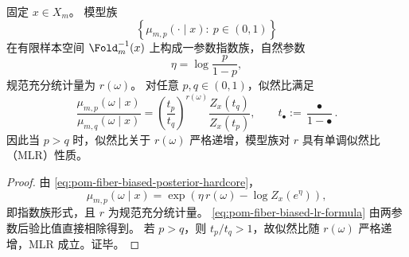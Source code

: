 \begin{proposition}\label{prop:pom-fiber-biased-posterior-mlr}
固定 \(x\in X_m\)。
模型族
\[
\left\{\mu_{m,p}(\cdot\mid x):\ p\in(0,1)\right\}
\]
在有限样本空间 \(\Fold_m^{-1}(x)\) 上构成一参数指数族，自然参数
\[
\eta=\log\frac{p}{1-p},
\]
规范充分统计量为 \(r(\omega)\)。
对任意 \(p,q\in(0,1)\)，似然比满足
\begin{equation}\label{eq:pom-fiber-biased-lr-formula}
\frac{\mu_{m,p}(\omega\mid x)}{\mu_{m,q}(\omega\mid x)}
=
\left(\frac{t_p}{t_q}\right)^{r(\omega)}
\frac{Z_x(t_q)}{Z_x(t_p)},
\qquad
t_\bullet:=\frac{\bullet}{1-\bullet}.
\end{equation}
因此当 \(p>q\) 时，似然比关于 \(r(\omega)\) 严格递增，模型族对 \(r\) 具有单调似然比（MLR）性质。
\end{proposition}
\begin{proof}
由 \eqref{eq:pom-fiber-biased-posterior-hardcore}，
\[
\mu_{m,p}(\omega\mid x)
=\exp\!\left(\eta\,r(\omega)-\log Z_x(e^\eta)\right),
\]
即指数族形式，且 \(r\) 为规范充分统计量。
\eqref{eq:pom-fiber-biased-lr-formula} 由两参数后验比值直接相除得到。
若 \(p>q\)，则 \(t_p/t_q>1\)，故似然比随 \(r(\omega)\) 严格递增，MLR 成立。证毕。
\end{proof}

